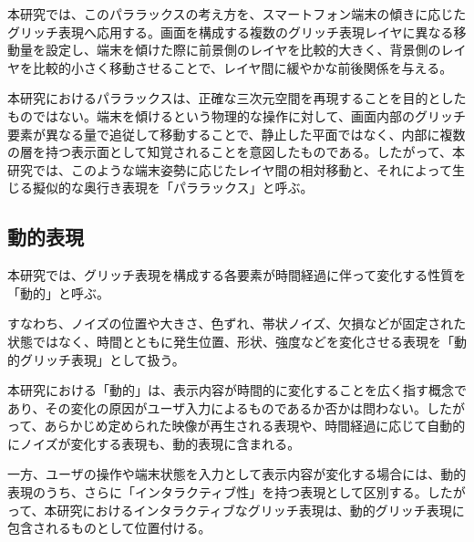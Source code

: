 本研究では、このパララックスの考え方を、スマートフォン端末の傾きに応じたグリッチ表現へ応用する。画面を構成する複数のグリッチ表現レイヤに異なる移動量を設定し、端末を傾けた際に前景側のレイヤを比較的大きく、背景側のレイヤを比較的小さく移動させることで、レイヤ間に緩やかな前後関係を与える。

本研究におけるパララックスは、正確な三次元空間を再現することを目的としたものではない。端末を傾けるという物理的な操作に対して、画面内部のグリッチ要素が異なる量で追従して移動することで、静止した平面ではなく、内部に複数の層を持つ表示面として知覚されることを意図したものである。したがって、本研究では、このような端末姿勢に応じたレイヤ間の相対移動と、それによって生じる擬似的な奥行き表現を「パララックス」と呼ぶ。



\subsection{動的表現}

本研究では、グリッチ表現を構成する各要素が時間経過に伴って変化する性質を「動的」と呼ぶ。

すなわち、ノイズの位置や大きさ、色ずれ、帯状ノイズ、欠損などが固定された状態ではなく、時間とともに発生位置、形状、強度などを変化させる表現を「動的グリッチ表現」として扱う。

本研究における「動的」は、表示内容が時間的に変化することを広く指す概念であり、その変化の原因がユーザ入力によるものであるか否かは問わない。したがって、あらかじめ定められた映像が再生される表現や、時間経過に応じて自動的にノイズが変化する表現も、動的表現に含まれる。

一方、ユーザの操作や端末状態を入力として表示内容が変化する場合には、動的表現のうち、さらに「インタラクティブ性」を持つ表現として区別する。したがって、本研究におけるインタラクティブなグリッチ表現は、動的グリッチ表現に包含されるものとして位置付ける。

